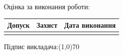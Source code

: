 \documentclass[12pt]{article}
\begin{document}
\vfill
{\fontsize{14}{16.2}\selectfont
Оцінка за виконання роботи:
\smallskip

\renewcommand{\arraystretch}{4}
\begin{tabular}{|c|c|c|}
	\hline
	\hspace{15pt} Допуск \hspace{15pt} & \hspace{15pt} Захист \hspace{15pt}
	& \hspace{15pt} Дата виконання \hspace{15pt}\\
	\hline
	 &  & \\
	\hline

\end{tabular}

\bigskip

	\begin{flushright}
		Підпис викладача:\line(1,0){70}\hspace{100pt}\hphantom{1pt}
	\end{flushright}
	}
\end{document}

